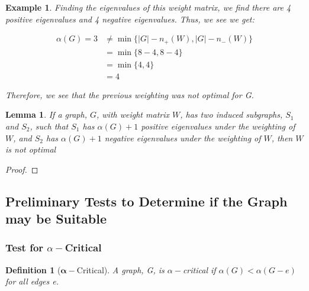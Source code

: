 \documentclass[12pt]{article}
\theoremstyle{parenbold}
\newtheorem{definition}{Definition}[section]
\newtheorem{exmp}{Example}[section]
\newtheorem{lemma}{Lemma}[section]
\begin{document}
\begin{exmp}
Finding the eigenvalues of this weight matrix, we find there are 4 positive eigenvalues and 4 negative eigenvalues. Thus, we see we get:

\begin{equation}
\begin{split}
\alpha(G) = 3 & \neq \min\{|G| - n_+(W),|G| - n_-(W)\} \\
& = \min\{8 - 4,8 - 4\} \\
& = \min\{4,4\} \\
& = 4
\end{split}
\end{equation}

Therefore, we see that the previous weighting was not optimal for G.
\end{exmp}

\begin{lemma}
If a graph, $G$, with weight matrix $W$, has two induced subgraphs, $S_1$ and $S_2$, such that $S_1$ has $\alpha(G)+1$ positive eigenvalues under the weighting of $W$, and $S_2$ has $\alpha(G)+1$ negative eigenvalues under the weighting of $W$, then $W$ is not optimal
\end{lemma}

\begin{proof}



\end{proof}

\subsection{Preliminary Tests to Determine if the Graph may be Suitable}

\subsubsection{Test for $\alpha-$Critical}

\begin{definition}[$\bm{\alpha-}$Critical]
A graph, G, is $\alpha-$critical if $\alpha(G) < \alpha(G-e)$ for all edges e.
\end{definition}
\end{document}
